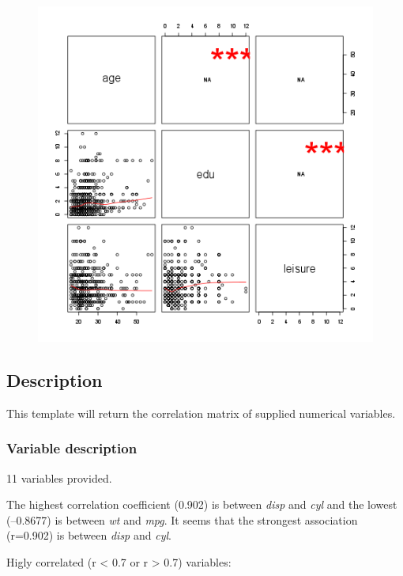 \documentclass{article}
\makeatletter
\def\maxwidth{\ifdim\Gin@nat@width>\linewidth\linewidth
\else\Gin@nat@width\fi}
\let\Oldincludegraphics\includegraphics
\renewcommand{\includegraphics}[1]{\Oldincludegraphics[width=\maxwidth]{#1}}
\makeatother
\begin{document}
\begin{figure}[htbp]
\centering
\includegraphics{fc8b6edbaddadbdf0c5014f99fda88d6.png}
\caption{}
\end{figure}

\subsection{Description}

This template will return the correlation matrix of supplied numerical
variables.

\subsubsection{Variable description}

11 variables provided.

The highest correlation coefficient (0.902) is between \emph{disp} and
\emph{cyl} and the lowest (--0.8677) is between \emph{wt} and
\emph{mpg}. It seems that the strongest association (r=0.902) is between
\emph{disp} and \emph{cyl}.

Higly correlated (r \textless{} 0.7 or r \textgreater{} 0.7) variables:
\end{document}
